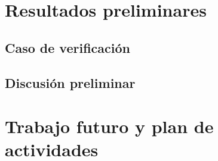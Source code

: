 \section{Resultados preliminares}
\label{sec:resultados_preliminares}

\subsection{Caso de verificación}

\subsection{Discusión preliminar}


\section{Trabajo futuro y plan de actividades}
\label{sec:trabajo_futuro}
